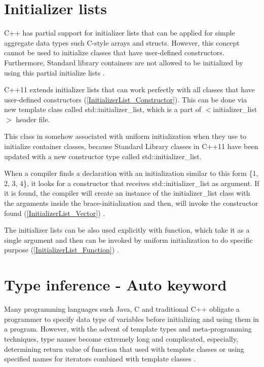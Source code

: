 \documentclass[11pt]{report}
\begin{document}
\section{Initializer lists}
\label{section: Initializer lists}
C++ has partial support for initializer lists that can be applied for simple aggregate data types such C-style arrays and structs. However, this concept cannot be used to initialize classes that have user-defined constructors. Furthermore, Standard library containers are not allowed to be initialized by using this partial initialize lists \cite{Reddy:2011:API}.


C++11 extends initializer lists that can work perfectly with all classes that have user-defined constructors (\ref{InitializerList_Constructor}). This can be done via new template class called std::initializer\_list, which is a part of $<$initializer\_list$>$ header file.


This class in somehow associated with uniform initialization when they use to initialize container classes, because Standard Library classes in C++11 have been updated with a new constructor type called std::initializer\_list.


When a compiler finds a declaration with an initialization similar to this form \{1, 2, 3, 4\}, it looks for a constructor that receives std::initializer\_list as argument. If it is found, the compiler will create an instance of the initializer\_list class with the arguments inside the brace-initialization and then, will invoke the constructor found (\ref{InitializerList_Vector}) \cite{Reddy:2011:API}. 


The initializer lists can be also used explicitly with function, which take it as a single argument and then can be invoked by uniform initialization to do specific purpose (\ref{InitializerList_Function}) \cite{Reddy:2011:API}.


\section{Type inference - Auto keyword}
\label{section: Auto keyword}
Many programming languages such Java, C and traditional C++ obligate a programmer to specify data type of variables before initializing and using them in a program. However, with the advent of template types and meta-programming techniques, type names become extremely long and complicated, especially, determining return value of function that used with template classes or using specified names for iterators combined with template classes \cite{Horstmann:2008:BC}.
\end{document}
